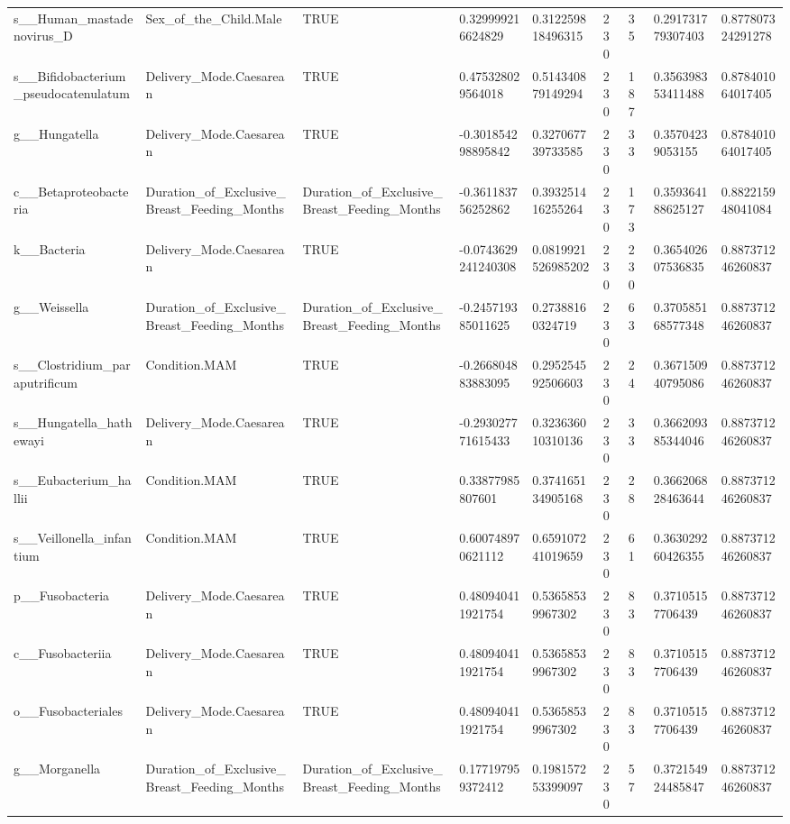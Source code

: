 \begin{longtable}{lllllllll}
s\_\_Human\_mastadenovirus\_D & Sex\_of\_the\_Child.Male & TRUE & 0.329999216624829 & 0.312259818496315 & 230 & 35 & 0.291731779307403 & 0.877807324291278 \\
s\_\_Bifidobacterium\_pseudocatenulatum & Delivery\_Mode.Caesarean & TRUE & 0.475328029564018 & 0.514340879149294 & 230 & 187 & 0.356398353411488 & 0.878401064017405 \\
g\_\_Hungatella & Delivery\_Mode.Caesarean & TRUE & -0.301854298895842 & 0.327067739733585 & 230 & 33 & 0.35704239053155 & 0.878401064017405 \\
c\_\_Betaproteobacteria & Duration\_of\_Exclusive\_Breast\_Feeding\_Months & Duration\_of\_Exclusive\_Breast\_Feeding\_Months & -0.361183756252862 & 0.393251416255264 & 230 & 173 & 0.359364188625127 & 0.882215948041084 \\
k\_\_Bacteria & Delivery\_Mode.Caesarean & TRUE & -0.0743629241240308 & 0.0819921526985202 & 230 & 230 & 0.365402607536835 & 0.887371246260837 \\
g\_\_Weissella & Duration\_of\_Exclusive\_Breast\_Feeding\_Months & Duration\_of\_Exclusive\_Breast\_Feeding\_Months & -0.245719385011625 & 0.27388160324719 & 230 & 63 & 0.370585168577348 & 0.887371246260837 \\
s\_\_Clostridium\_paraputrificum & Condition.MAM & TRUE & -0.266804883883095 & 0.295254592506603 & 230 & 24 & 0.367150940795086 & 0.887371246260837 \\
s\_\_Hungatella\_hathewayi & Delivery\_Mode.Caesarean & TRUE & -0.293027771615433 & 0.323636010310136 & 230 & 33 & 0.366209385344046 & 0.887371246260837 \\
s\_\_Eubacterium\_hallii & Condition.MAM & TRUE & 0.33877985807601 & 0.374165134905168 & 230 & 28 & 0.366206828463644 & 0.887371246260837 \\
s\_\_Veillonella\_infantium & Condition.MAM & TRUE & 0.600748970621112 & 0.659107241019659 & 230 & 61 & 0.363029260426355 & 0.887371246260837 \\
p\_\_Fusobacteria & Delivery\_Mode.Caesarean & TRUE & 0.480940411921754 & 0.53658539967302 & 230 & 83 & 0.37105157706439 & 0.887371246260837 \\
c\_\_Fusobacteriia & Delivery\_Mode.Caesarean & TRUE & 0.480940411921754 & 0.53658539967302 & 230 & 83 & 0.37105157706439 & 0.887371246260837 \\
o\_\_Fusobacteriales & Delivery\_Mode.Caesarean & TRUE & 0.480940411921754 & 0.53658539967302 & 230 & 83 & 0.37105157706439 & 0.887371246260837 \\
g\_\_Morganella & Duration\_of\_Exclusive\_Breast\_Feeding\_Months & Duration\_of\_Exclusive\_Breast\_Feeding\_Months & 0.177197959372412 & 0.198157253399097 & 230 & 57 & 0.372154924485847 & 0.887371246260837 \\

\end{longtable}
